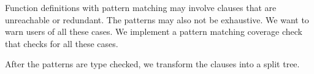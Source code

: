Function definitions with pattern matching may involve clauses that are unreachable or redundant. The patterns may also not be exhaustive. We want to warn users of all these cases. We implement a pattern matching coverage check that checks for all these cases.

After the patterns are type checked, we transform the clauses into a split tree.
